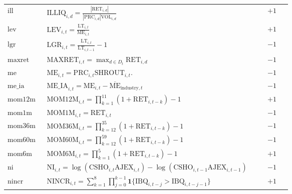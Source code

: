 \documentclass[11pt]{article}
\begin{document}
\begin{landscape}
\begin{longtable}{p{0.13\linewidth}p{0.73\linewidth}p{0.08\linewidth}}
\(\mathrm{ill}\) &
\(\displaystyle \mathrm{ILLIQ}_{i,d}=\frac{|\mathrm{RET}_{i,d}|}{|\mathrm{PRC}_{i,d}|\mathrm{VOL}_{i,d}}\)  & \(+1\)\\

\(\mathrm{lev}\) &
\(\displaystyle \mathrm{LEV}_{i,t}=\frac{\mathrm{LT}_{i,t}}{\mathrm{ME}_{i,t}}\)  & \(+1\)\\

\(\mathrm{lgr}\) &
\(\displaystyle \mathrm{LGR}_{i,t}=\frac{\mathrm{LT}_{i,t}}{\mathrm{LT}_{i,t-1}}-1\)  & \(-1\)\\

\(\mathrm{maxret}\) &
\(\displaystyle \mathrm{MAXRET}_{i,t}=\max_{d\in D_t}\mathrm{RET}_{i,d}\)  & \(-1\)\\

\(\mathrm{me}\) &
\(\displaystyle \mathrm{ME}_{i,t}=\mathrm{PRC}_{i,t}\mathrm{SHROUT}_{i,t}\).  & \(-1\)\\

\(\mathrm{me\_ia}\) &
\(\displaystyle \mathrm{ME\_IA}_{i,t}=\mathrm{ME}_{i,t}-\overline{\mathrm{ME}}_{\mathrm{industry},t}\)  & \(-1\)\\

\(\mathrm{mom12m}\) &
\(\displaystyle \mathrm{MOM12M}_{i,t}=\prod_{k=1}^{11}(1+\mathrm{RET}_{i,t-k})-1\)  & \(+1\)\\

\(\mathrm{mom1m}\) &
\(\displaystyle \mathrm{MOM1M}_{i,t}=\mathrm{RET}_{i,t}\)  & \(-1\)\\

\(\mathrm{mom36m}\) &
\(\displaystyle \mathrm{MOM36M}_{i,t}=\prod_{k=12}^{35}(1+\mathrm{RET}_{i,t-k})-1\)  & \(-1\)\\

\(\mathrm{mom60m}\) &
\(\displaystyle \mathrm{MOM60M}_{i,t}=\prod_{k=12}^{59}(1+\mathrm{RET}_{i,t-k})-1\)  & \(-1\)\\

\(\mathrm{mom6m}\) &
\(\displaystyle \mathrm{MOM6M}_{i,t}=\prod_{k=1}^{5}(1+\mathrm{RET}_{i,t-k})-1\)  & \(+1\)\\

\(\mathrm{ni}\) &
\(\displaystyle \mathrm{NI}_{i,t}=\log(\mathrm{CSHO}_{i,t}\mathrm{AJEX}_{i,t})
-\log(\mathrm{CSHO}_{i,t-1}\mathrm{AJEX}_{i,t-1})\)  & \(-1\)\\

\(\mathrm{nincr}\) &
\(\displaystyle \mathrm{NINCR}_{i,t}=\sum_{k=1}^{8}\prod_{j=0}^{k-1}\mathbf{1}\{\mathrm{IBQ}_{i,t-j}>\mathrm{IBQ}_{i,t-j-1}\}\)  & \(+1\)\\


\end{longtable}
\end{landscape}
\end{document}
